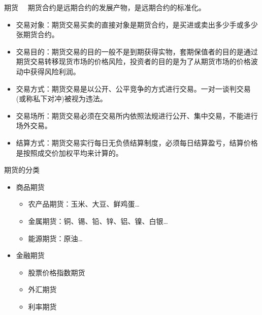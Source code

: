 \documentclass{beamer}
\begin{document}
\begin{frame}{期货}
  　期货合约是远期合约的发展产物，是远期合约的标准化。
  \begin{itemize}
    \item 交易对象：期货交易买卖的直接对象是期货合约，是买进或卖出多少手或多少张期货合约。
    \item 交易目的：期货交易的目的一般不是到期获得实物，套期保值者的目的是通过期货交易转移现货市场的价格风险，投资者的目的是为了从期货市场的价格波动中获得风险利润。 
    \item 交易方式：期货交易是以公开、公平竞争的方式进行交易。一对一谈判交易(或称私下对冲)被视为违法。
    \item 交易场所：期货交易必须在交易所内依照法规进行公开、集中交易，不能进行场外交易。
    \item 结算方式：期货交易实行每日无负债结算制度，必须每日结算盈亏，结算价格是按照成交价加权平均来计算的。
  \end{itemize}
\end{frame}
\begin{frame}{期货的分类}
  \begin{itemize}
    \item 商品期货
      \begin{itemize}
	\item 农产品期货：玉米、大豆、鲜鸡蛋\ldots
	\item 金属期货：铜、锡、铅、锌、铝、镍、白银\ldots
	\item 能源期货：原油\ldots
      \end{itemize}
    \item 金融期货
      \begin{itemize}
	\item 股票价格指数期货
	\item 外汇期货
	\item 利率期货
      \end{itemize}
  \end{itemize}
\end{frame}
\end{document}
